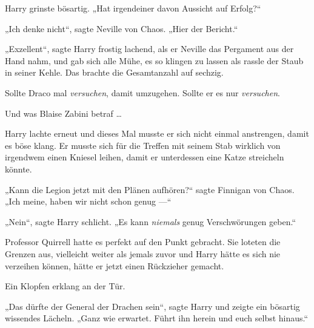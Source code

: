 Harry grinste bösartig.
„Hat irgendeiner davon Aussicht auf Erfolg?“

„Ich denke nicht“, sagte Neville von Chaos.
„Hier der Bericht.“

„Exzellent“, sagte Harry frostig lachend, als er Neville das Pergament aus der Hand nahm, und gab sich alle Mühe, es so klingen zu lassen als rassle der Staub in seiner Kehle. Das brachte die Gesamtanzahl auf sechzig.

Sollte Draco mal \emph{versuchen}, damit umzugehen. Sollte er es nur \emph{versuchen}.

Und was Blaise Zabini betraf …

Harry lachte erneut und dieses Mal musste er sich nicht einmal anstrengen, damit es böse klang. Er musste sich für die Treffen mit seinem Stab wirklich von irgendwem einen Kniesel leihen, damit er unterdessen eine Katze streicheln könnte.

„Kann die Legion jetzt mit den Plänen aufhören?“ sagte Finnigan von Chaos.
„Ich meine, haben wir nicht schon genug —“

„Nein“, sagte Harry schlicht.
„Es kann \emph{niemals} genug Verschwörungen geben.“

Professor Quirrell hatte es perfekt auf den Punkt gebracht. Sie loteten die Grenzen aus, vielleicht weiter als jemals zuvor und Harry hätte es sich nie verzeihen können, hätte er jetzt einen Rückzieher gemacht.

Ein Klopfen erklang an der Tür.

„Das dürfte der General der Drachen sein“, sagte Harry und zeigte ein bösartig wissendes Lächeln.
„Ganz wie erwartet. Führt ihn herein und euch selbst hinaus.“

